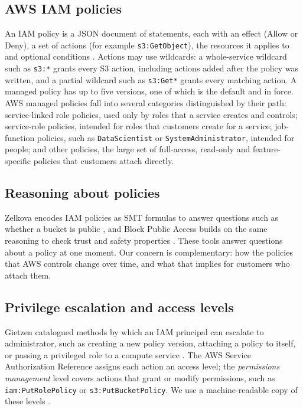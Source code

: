 \documentclass[journal]{IEEEtran}
\begin{document}
\subsection{AWS IAM policies}
An IAM policy is a JSON document of statements, each with an effect (Allow or Deny), a set of actions (for example
\texttt{s3:GetObject}), the resources it applies to and optional conditions \cite{awsmanaged}. Actions may use wildcards: a whole-service
wildcard such as \texttt{s3:*} grants every S3 action, including actions added after the policy was written, and a partial wildcard
such as \texttt{s3:Get*} grants every matching action. A managed policy has up to five versions, one of which is the default and in
force. AWS managed policies fall into several categories distinguished by their path: service-linked role policies, used only by
roles that a service creates and controls; service-role policies, intended for roles that customers create for a service; job-function
policies, such as \texttt{DataScientist} or \texttt{SystemAdministrator}, intended for people; and other policies, the large set of
full-access, read-only and feature-specific policies that customers attach directly.

\subsection{Reasoning about policies}
Zelkova encodes IAM policies as SMT formulas to answer questions such as whether a bucket is public \cite{backes2018zelkova}, and Block
Public Access builds on the same reasoning to check trust and safety properties \cite{bouchet2020blockpublic}. These tools answer
questions about a policy at one moment. Our concern is complementary: how the policies that AWS controls change over time, and what
that implies for customers who attach them.

\subsection{Privilege escalation and access levels}
Gietzen catalogued methods by which an IAM principal can escalate to administrator, such as creating a new policy version, attaching
a policy to itself, or passing a privileged role to a compute service \cite{gietzen2018}. The AWS Service Authorization Reference
assigns each action an access level; the \emph{permissions management} level covers actions that grant or modify permissions, such as
\texttt{iam:PutRolePolicy} or \texttt{s3:PutBucketPolicy}. We use a machine-readable copy of these levels \cite{iamdataset}.
\end{document}
